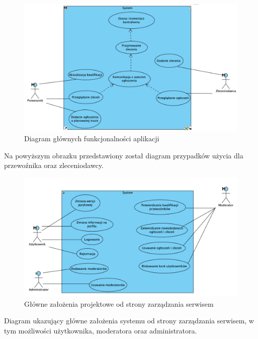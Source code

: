 \begin{figure}[H]
	\centering
		\includegraphics[width=0.9\linewidth]{rozdzial1/glowne_zalozenia.png}
	\caption{Diagram głównych funkcjonalności aplikacji}
	\label{Rys. fig:Diagram głównych funkcjonalności aplikacji}
\end{figure}

Na powyższym obrazku przedstawiony został diagram przypadków użycia dla przewoźnika oraz zleceniodawcy.

\begin{figure}[H]
	\centering
		\includegraphics[width=0.9\linewidth]{rozdzial1/ogolny_schemat.png}
	\caption{Główne założenia projektowe od strony zarządzania serwisem}
	\label{Rys. fig:Główne założenia projektowe od strony zarządzania serwisem}
\end{figure}

Diagram ukazujący główne założenia systemu od strony zarządzania serwisem, w tym możliwości użytkownika, moderatora oraz administratora.